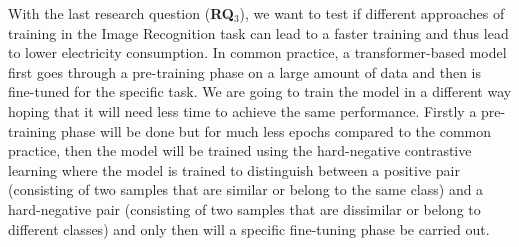 With the last research question (\textbf{RQ$_{3}$}), we want to test if different approaches of training in the Image Recognition task can lead to a faster training and thus lead to lower electricity consumption. In common practice, a transformer-based model first goes through a pre-training phase on a large amount of data and then is fine-tuned for the specific task. We are going to train the model in a different way hoping that it will need less time to achieve the same performance. Firstly a pre-training phase will be done but for much less epochs compared to the common practice, then the model will be trained using the hard-negative contrastive learning where the model is trained to distinguish between a positive pair (consisting of two samples that are similar or belong to the same class) and a hard-negative pair  (consisting of two samples that are dissimilar or belong to different classes) and only then will a specific fine-tuning phase be carried out.